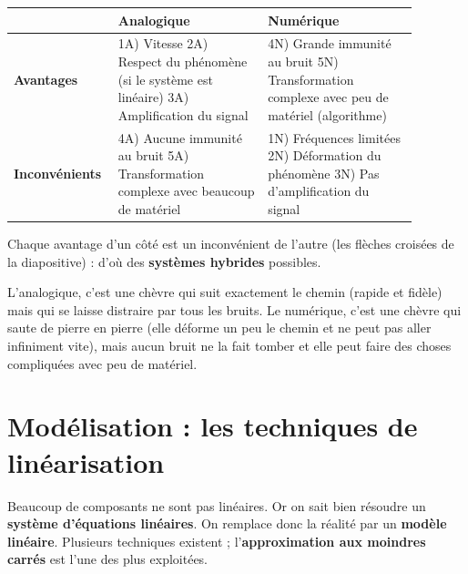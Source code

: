 \begin{center}
\begin{tabular}{p{0.18\linewidth}|p{0.35\linewidth}|p{0.35\linewidth}}
 & \textbf{Analogique} & \textbf{Numérique} \\ \hline
\textbf{Avantages} &
1A) Vitesse \newline 2A) Respect du phénomène (si le système est linéaire) \newline
3A) Amplification du signal &
4N) Grande immunité au bruit \newline 5N) Transformation complexe avec peu de matériel
(algorithme) \\ \hline
\textbf{Inconvénients} &
4A) Aucune immunité au bruit \newline 5A) Transformation complexe avec beaucoup de
matériel &
1N) Fréquences limitées \newline 2N) Déformation du phénomène \newline 3N) Pas
d'amplification du signal \\
\end{tabular}
\end{center}

Chaque avantage d'un côté est un inconvénient de l'autre (les flèches croisées de la
diapositive) : d'où des \textbf{systèmes hybrides} possibles.

\begin{goatbox}
L'analogique, c'est une chèvre qui suit exactement le chemin (rapide et fidèle) mais qui se
laisse distraire par tous les bruits. Le numérique, c'est une chèvre qui saute de pierre en
pierre (elle déforme un peu le chemin et ne peut pas aller infiniment vite), mais aucun bruit
ne la fait tomber et elle peut faire des choses compliquées avec peu de matériel.
\end{goatbox}

\section{Modélisation : les techniques de linéarisation}


Beaucoup de composants ne sont pas linéaires. Or on sait bien résoudre un \textbf{système
d'équations linéaires}. On remplace donc la réalité par un \textbf{modèle linéaire}.
Plusieurs techniques existent ; l'\textbf{approximation aux moindres carrés} est l'une des
plus exploitées.

